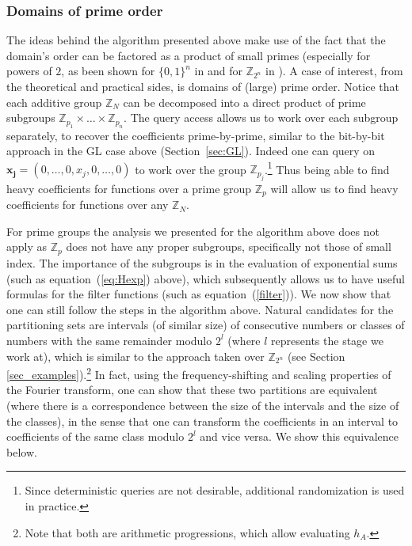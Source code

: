 \documentclass[11pt]{article}
\theoremstyle{definition}
\newcommand{\Z}{\mathbb{Z}}
\begin{document}
\subsubsection{Domains of prime order}

The ideas behind the algorithm presented above make use of the fact that the domain's order can be factored as a product of small primes (especially for powers of $2$, as been shown for $\{0,1\}^n$ in \cite{KM} and for $\Z_{2^n}$ in \cite{Mansour92}). A case of interest, from the theoretical and practical sides, is domains of (large) prime order. Notice that each additive group $\Z_N$ can be decomposed into a direct product of prime subgroups $\Z_{p_1} \times \dots \times \Z_{p_n}$. The query access allows us to work over each subgroup separately, to recover the coefficients prime-by-prime, similar to the bit-by-bit approach in the GL case above (Section~\ref{sec:GL}). Indeed one can query on $\textbf{x}\boldsymbol{_j} = (0,\dots,0,x_j,0,\ldots,0)$ to work over the group $\Z_{p_j}$.\footnote{Since deterministic queries are not desirable, additional randomization is used in practice.} Thus being able to find heavy coefficients for functions over a prime group $\Z_p$ will allow us to find heavy coefficients for functions over any $\Z_N$.

For prime groups the analysis we presented for the algorithm above does not apply as $\Z_p$ does not have any proper subgroups, specifically not those of small index.
The importance of the subgroups is in the evaluation of exponential sums (such as equation~(\ref{eq:Hexp}) above), which subsequently allows us to have useful formulas for the filter functions (such as equation~(\ref{filter})).
We now show that one can still follow the steps in the algorithm above. Natural candidates for the partitioning sets are intervals (of similar size) of consecutive numbers or classes of numbers with the same remainder modulo $2^l$ (where $l$ represents the stage we work at), which is similar to the approach taken over $\Z_{2^n}$ (see Section \ref{sec_examples}).\footnote{Note that both are arithmetic progressions, which allow evaluating $h_A$.} In fact, using the frequency-shifting and scaling properties of the Fourier transform, one can show that these two partitions are equivalent (where there is a correspondence between the size of the intervals and the size of the classes), in the sense that one can transform the coefficients in an interval to coefficients of the same class modulo $2^l$ and vice versa. We show this equivalence below.
\end{document}
